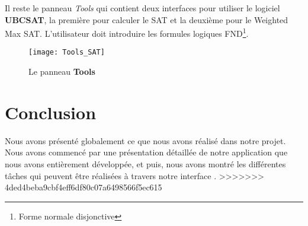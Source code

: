 Il reste le panneau \textit{Tools} qui contient deux interfaces pour utiliser le logiciel \textbf{UBCSAT}, la
première pour calculer le SAT et la deuxième pour le Weighted Max SAT. L'utilisateur doit introduire les formules
logiques FND\footnote{Forme normale disjonctive}.

\begin{figure}[H]
\centering
\texttt{[image: Tools\_SAT]}
\caption{Le panneau \textbf{Tools}}

\end{figure}

{}
\section*{Conclusion}

Nous avons présenté globalement ce que nous avons réalisé dans notre projet. Nous avons commencé par une
présentation détaillée de notre application \appname que nous avons entièrement développée, et puis, nous
avons montré les différentes tâches qui peuvent être réalisées à travers notre interface \platformename.
>>>>>>> 4ded4beba9cbf4eff6df80c07a6498566f5ec615
